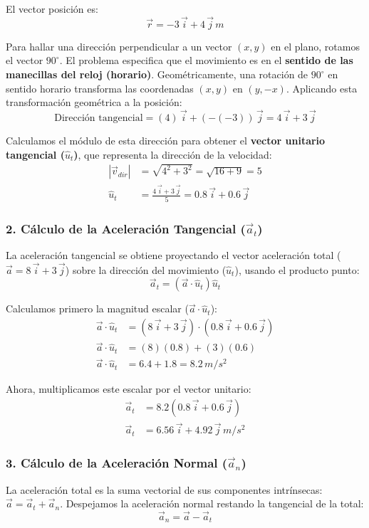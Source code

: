 \documentclass[12pt, a4paper]{article}
\begin{document}
El vector posición es:
$$ \vec{r} = -3 \, \vec{i} + 4 \, \vec{j} \, \si{m} $$

Para hallar una dirección perpendicular a un vector $(x, y)$ en el plano, rotamos el vector $90^\circ$. El problema especifica que el movimiento es en el \textbf{sentido de las manecillas del reloj (horario)}. Geométricamente, una rotación de $90^\circ$ en sentido horario transforma las coordenadas $(x, y)$ en $(y, -x)$.
Aplicando esta transformación geométrica a la posición:
$$ \text{Dirección tangencial} = (4) \, \vec{i} + (-(-3)) \, \vec{j} = 4 \, \vec{i} + 3 \, \vec{j} $$

Calculamos el módulo de esta dirección para obtener el \textbf{vector unitario tangencial ($\hat{u}_t$)}, que representa la dirección de la velocidad:
\begin{align*}
    |\vec{v}_{dir}| &= \sqrt{4^2 + 3^2} = \sqrt{16 + 9} = 5 \\
    \hat{u}_t &= \frac{4 \, \vec{i} + 3 \, \vec{j}}{5} = 0.8 \, \vec{i} + 0.6 \, \vec{j}
\end{align*}

\subsubsection*{2. Cálculo de la Aceleración Tangencial ($\vec{a}_t$)}
La aceleración tangencial se obtiene proyectando el vector aceleración total ($\vec{a} = 8 \, \vec{i} + 3 \, \vec{j}$) sobre la dirección del movimiento ($\hat{u}_t$), usando el producto punto:
$$ \vec{a}_t = (\vec{a} \cdot \hat{u}_t) \hat{u}_t $$

Calculamos primero la magnitud escalar ($\vec{a} \cdot \hat{u}_t$):
\begin{align*}
    \vec{a} \cdot \hat{u}_t &= (8 \, \vec{i} + 3 \, \vec{j}) \cdot (0.8 \, \vec{i} + 0.6 \, \vec{j}) \\
    \vec{a} \cdot \hat{u}_t &= (8)(0.8) + (3)(0.6) \\
    \vec{a} \cdot \hat{u}_t &= 6.4 + 1.8 = 8.2 \, \si{m/s^2}
\end{align*}

Ahora, multiplicamos este escalar por el vector unitario:
\begin{align*}
    \vec{a}_t &= 8.2 (0.8 \, \vec{i} + 0.6 \, \vec{j}) \\
    \vec{a}_t &= 6.56 \, \vec{i} + 4.92 \, \vec{j} \, \si{m/s^2}
\end{align*}

\subsubsection*{3. Cálculo de la Aceleración Normal ($\vec{a}_n$)}
La aceleración total es la suma vectorial de sus componentes intrínsecas: $\vec{a} = \vec{a}_t + \vec{a}_n$.
Despejamos la aceleración normal restando la tangencial de la total:
$$ \vec{a}_n = \vec{a} - \vec{a}_t $$
\end{document}
